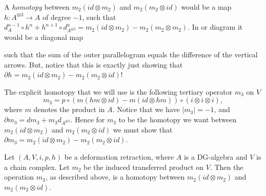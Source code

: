 A \emph{homotopy} between $m_2(id\otimes m_2)$ and $m_2(m_2\otimes id)$ would be a map $h\colon A^{\otimes 3}\longrightarrow A$ of degree $-1$, such that $d_A^{n-1}\circ h^{n} + h^{n+1}\circ d_{A^{\otimes 3}}^n = m_2(id\otimes m_2)-m_2(m_2\otimes m_2)$. In or diagram it would be a diagonal map
\begin{center}
\end{center}
such that the sum of the outer parallelogram equals the difference of the vertical arrows. But, notice that this is exactly just showing that $\partial h = m_2(id\otimes m_2)-m_2(m_2\otimes id)$!

The explicit homotopy that we will use is the following tertiary operator $m_3$ on $V$
\begin{equation*}
    m_3 = p\circ (m(hm\otimes id)-m(id\otimes hm))\circ (i\otimes i \otimes i),
\end{equation*}
where $m$ denotes the product in $A$. Notice that we have $|m_3|=-1$, and $\partial m_3 = dm_3 + m_3 d_{A^{\otimes 3}}$. Hence for $m_3$ to be the homotopy we want between $m_2(id\otimes m_2)$ and $m_2(m_2\otimes id)$ we must show that $\partial m_3 = m_2(id\otimes m_2)-m_2(m_2\otimes id)$. 

\begin{theorem}
Let $(A,V, i,p,h)$ be a deformation retraction, where $A$ is a DG-algebra and $V$ is a chain complex. Let $m_2$ be the induced transferred product on $V$. Then the operation $m_3$, as described above, is a homotopy between $m_2(id\otimes m_2)$ and $m_2(m_2\otimes id)$. 
\end{theorem}

